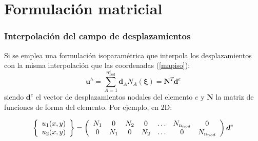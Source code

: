 \documentclass{beamer}
\begin{document}
\section{Formulación matricial}
\begin{frame}
\frametitle{Interpolación del campo de desplazamientos}

Si se emplea una formulación isoparamétrica que interpola los
desplazamientos con la misma interpolación que las coordenadas
(\ref{mapiso}):
\begin{equation}
\bm{u}^h=\sum_{A=1}^{n^e_{\textrm{nod}}}
\bm{d}_{A} N_{A}(\bm{\xi}) = \mathbf{N}^{T} \bm{d}^e \label{disiso}
\end{equation}
siendo $\bm{d}^e$ el vector de desplazamientos nodales del elemento $e$
y $\mathbf{N}$ la matriz de funciones de forma del elemento. Por ejemplo, en
$2$D:
\begin{small}
\begin{equation}
\left\{
\begin{array}{c}
u_1(x,y) \\
u_2(x,y) 
\end{array}
\right\}=
\left(
\begin{array}{ccccccc}
N_1 &  0  & N_2 &  0  & \ldots & N_{\textrm n_{nod}} & 0                    \\
0   & N_1 &  0  & N_2 & \ldots &           0          & N_{\textrm n_{nod}}
\end{array}
\right) \bm{d}^e
\label{indisge}
\end{equation}
\end{small}
\end{frame}
\end{document}
